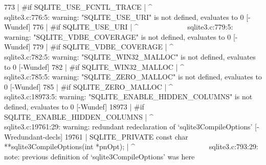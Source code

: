   773 | #if SQLITE_USE_FCNTL_TRACE
      |     ^~~~~~~~~~~~~~~~~~~~~~
sqlite3.c:776:5: warning: "SQLITE_USE_URI" is not defined, evaluates to 0 [-Wundef]
  776 | #if SQLITE_USE_URI
      |     ^~~~~~~~~~~~~~
sqlite3.c:779:5: warning: "SQLITE_VDBE_COVERAGE" is not defined, evaluates to 0 [-Wundef]
  779 | #if SQLITE_VDBE_COVERAGE
      |     ^~~~~~~~~~~~~~~~~~~~
sqlite3.c:782:5: warning: "SQLITE_WIN32_MALLOC" is not defined, evaluates to 0 [-Wundef]
  782 | #if SQLITE_WIN32_MALLOC
      |     ^~~~~~~~~~~~~~~~~~~
sqlite3.c:785:5: warning: "SQLITE_ZERO_MALLOC" is not defined, evaluates to 0 [-Wundef]
  785 | #if SQLITE_ZERO_MALLOC
      |     ^~~~~~~~~~~~~~~~~~
sqlite3.c:18973:5: warning: "SQLITE_ENABLE_HIDDEN_COLUMNS" is not defined, evaluates to 0 [-Wundef]
18973 | #if SQLITE_ENABLE_HIDDEN_COLUMNS
      |     ^~~~~~~~~~~~~~~~~~~~~~~~~~~~
sqlite3.c:19761:29: warning: redundant redeclaration of ‘sqlite3CompileOptions’ [-Wredundant-decls]
19761 | SQLITE_PRIVATE const char **sqlite3CompileOptions(int *pnOpt);
      |                             ^~~~~~~~~~~~~~~~~~~~~
sqlite3.c:793:29: note: previous definition of ‘sqlite3CompileOptions’ was here
